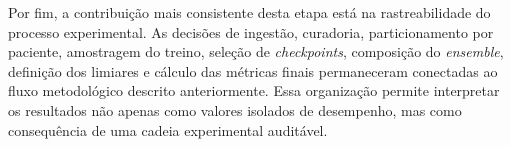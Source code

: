 Por fim, a contribuição mais consistente desta etapa está na rastreabilidade do processo experimental. As decisões de ingestão, curadoria, particionamento por paciente, amostragem do treino, seleção de \textit{checkpoints}, composição do \textit{ensemble}, definição dos limiares e cálculo das métricas finais permaneceram conectadas ao fluxo metodológico descrito anteriormente. Essa organização permite interpretar os resultados não apenas como valores isolados de desempenho, mas como consequência de uma cadeia experimental auditável.
